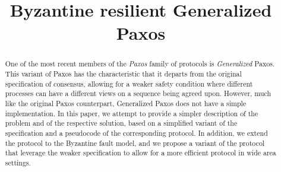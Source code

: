 \documentclass[10pt,pdftex,a4paper]{article}%
\begin{document}


\title{Byzantine resilient Generalized Paxos}
\date{}
\maketitle
%
\setcounter{page}{1}
%
\begin{abstract}
%
One of the most recent members of the \emph{Paxos} family of protocols is \emph{Generalized} Paxos. 
This variant of Paxos has the characteristic that it departs from the original specification of consensus, 
allowing for a weaker safety condition where different processes can have a different views on a sequence being agreed upon. 
However, much like the original Paxos counterpart, Generalized Paxos does not have a simple implementation. 
In this paper, we attempt to provide a simpler description of the problem and of the respective solution, based on a simplified variant of the specification and a pseudocode of the corresponding protocol. 
In addition, we extend the protocol to the Byzantine fault model, and we propose a variant of the protocol that leverage the weaker specification to allow for a more efficient protocol in wide area settings.
\end{abstract}
%

%

%

%

%

%

%


\end{document}
